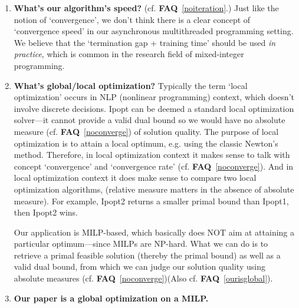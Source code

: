 \documentclass[11pt]{article}
\newcommand{\faq}[1]{\textbf{FAQ}~\ref{#1}}
\begin{document}
\begin{enumerate}
    In asynchronous programming context, does the concept of `an iteration' exist?
    Yes, it does. For example,
    the master problem has updated its coordination signal $\boldsymbol{\beta}$,
    which can be deemed an iteration.
    However, it is just not meaningful to talk about algorithm speed with this
    concept of `iteration'.
    \par
    Indeed, the master problem may recruit one cut and conduct a re-optimization (to generate
    $\boldsymbol{\beta}$), or it can recruit a bunch of cuts and conduct a
    re-optimization.
    Both situations are valid in practice.
    Therefore, the notion `iteration' literally can not be used in talking about
    algorithm speed.
    \item \textbf{What's our algorithm's speed?} \label{algospeed} (cf. \faq{noiteration}.) Just like
    the notion of `convergence', we don't think there is a clear concept of
    `convergence speed' in our asynchronous multithreaded programming setting.
    We believe that the `termination gap + training time' should be used \textit{in practice},
    which is common in the research field of mixed-integer programming. 
    \item \textbf{What's global/local optimization?} \label{localglobal} Typically the term `local optimization'
    occurs in NLP (nonlinear programming) context, which doesn't involve discrete decisions.
    Ipopt can be deemed a standard local optimization solver---it cannot provide a
    valid dual bound so we would have no absolute measure (cf. \faq{noconverge}) of solution quality.
    The purpose of local optimization is to attain a local optimum, e.g. using the
    classic Newton's method. Therefore, in local optimization context it makes sense to
    talk with concept `convergence' and `convergence rate' (cf. \faq{noconverge}).
    And in local optimization context it does make sense to compare two local optimization algorithms,
    (relative measure matters in the absence of absolute measure).
    For example, Ipopt2 returns a smaller primal bound than Ipopt1, then Ipopt2 wins.
    \par
    Our application is MILP-based, which basically does NOT aim at attaining
    a particular optimum---since MILPs are NP-hard.
    What we can do is to retrieve a primal feasible solution (thereby
    the primal bound) as well as a valid dual bound, from which we can judge our solution quality
    using absolute measures (cf. \faq{noconverge})(Also cf. \faq{ourisglobal}).
    \item \textbf{Our paper is a global optimization on a MILP.} \label{ourisglobal}

\end{enumerate}
\end{document}
